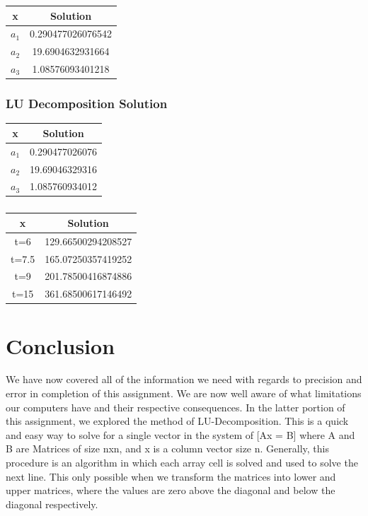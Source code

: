 \documentclass[twocolumn]{article}
\begin{document}
\begin{table}[H]
  \centering
  \begin{tabular}{|c|c|} \hline
x & Solution\\ \hline \hline
$a_1$ & 0.290477026076542 \\ \hline
$a_2$ & 19.6904632931664  \\ \hline
$a_3$ & 1.08576093401218 \\ \hline
\end{tabular}
\centering
\end{table}

\subsubsection{LU Decomposition Solution}
\begin{table}[H]
  \centering
  \begin{tabular}{|c|c|} \hline
x & Solution\\ \hline \hline
$a_1$ & 0.290477026076 \\ \hline
$a_2$ & 19.69046329316  \\ \hline
$a_3$ & 1.085760934012 \\ \hline
\end{tabular}
\centering
\end{table}
  
\subsubsection{}
\begin{table}[H]
  \centering
  \begin{tabular}{|c|c|} \hline
x & Solution\\ \hline \hline
t=6 & 129.66500294208527 \\ \hline
t=7.5 & 165.07250357419252 \\ \hline
t=9 & 201.78500416874886  \\ \hline
t=15 & 361.68500617146492 \\ \hline
\end{tabular}
\centering
\end{table}



\section{Conclusion}
We have now covered all of the information we need with regards to precision and error in completion of this assignment. We are now well aware of what limitations our computers have and their respective consequences. In the latter portion of this assignment, we explored the method of LU-Decomposition. This is a quick and easy way to solve for a single vector in the system of [Ax = B] where A and B are Matrices of size nxn, and x is a column vector size n. Generally, this procedure is an algorithm in which each array cell is solved and used to solve the next line. This only possible when we transform the matrices into lower and upper matrices, where the values are zero above the diagonal and below the diagonal respectively.
\end{document}
